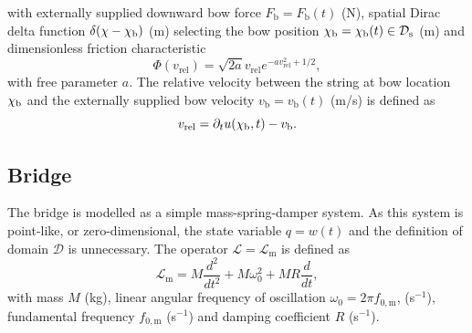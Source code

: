     with externally supplied downward bow force $F_\text{b} = F_\text{b}(t)$ (N), spatial Dirac delta function $\delta(\chi-\chi_\text{b})$ (m) selecting the bow position $\chi_\text{b} = \chi_\text{b}(t)\in \mathcal{D}_\text{s}$ (m) and dimensionless friction characteristic
    \begin{equation}
        \Phi(v_\text{rel}) = \sqrt{2a}v_\text{rel}e^{-av_\text{rel}^2+1/2},
    \end{equation}
    with free parameter $a$. The relative velocity between the string at bow location $\chi_\text{b}$ and the externally supplied bow velocity $v_\text{b} = v_\text{b}(t)$ (m/s) is defined as
    \begin{equation}
        v_\text{rel} = \partial_tu(\chi_\text{b},t) - v_\text{b}.
    \end{equation}
    
    \subsection{Bridge}
    The bridge is modelled as a simple mass-spring-damper system. As this system is point-like, or zero-dimensional, 
    the state variable $q = w(t)$ and the definition of domain $\mathcal{D}$ is unnecessary. The operator $\mathcal{L}=\mathcal{L}_\text{m}$ is defined as
    \begin{equation}
        \mathcal{L}_\text{m}=M\frac{d^2}{dt^2}+M\omega_0^2+MR\frac{d}{dt},
    \end{equation}
    with mass $M$ (kg), linear angular frequency of oscillation $\omega_0=2\pi f_{0,\text{m}}$,  (s$^{-1}$), fundamental frequency $f_{0,\text{m}}$ (s$^{-1}$) and damping coefficient $R$ (s$^{-1}$).
    
